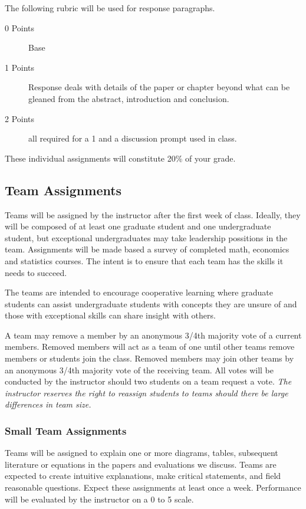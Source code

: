 \documentclass[letterpaper,10pt]{article}
\begin{document}
The following rubric will be used for response paragraphs.
\begin{description}
 \item[0 Points] Base
 \item[1 Points] Response deals with details of the paper or chapter beyond what can be gleaned from the abstract, introduction and conclusion.
 \item[2 Points] all required for a 1 and a discussion prompt used in class.
\end{description}

These individual assignments will constitute 20\% of your grade.

\subsection{Team Assignments}

Teams will be assigned by the instructor after the first week of
class.  Ideally, they will be composed of at least one graduate student and one
undergraduate student, but exceptional undergraduates may take leadership possitions in the team.  Assignments will be made based a survey of
completed math, economics and statistics courses.  The intent is to
ensure that each team has the skills it needs to succeed.

The teams are intended to encourage cooperative learning where
graduate students can assist undergraduate students with concepts they
are unsure of and those with exceptional skills can share insight with
others.

A team may remove a member by an anonymous 3/4th majority vote of a
current members. Removed members will act as a team of one until other
teams remove members or students join the class.  Removed members may
join other teams by an anonymous 3/4th majority vote of the receiving
team. All votes will be conducted by the instructor should two
students on a team request a vote. \emph{The instructor reserves the right to reassign students to teams should there be large differences in team size.}

\subsubsection{Small Team Assignments}

Teams will be assigned to explain one or more diagrams, tables,
subsequent literature or equations in the papers and evaluations we discuss. Teams are expected to create intuitive explanations, make critical statements,
and field reasonable questions. Expect these assignments at least once
a week. Performance will be evaluated by the instructor on a 0 to 5
scale.
\end{document}
